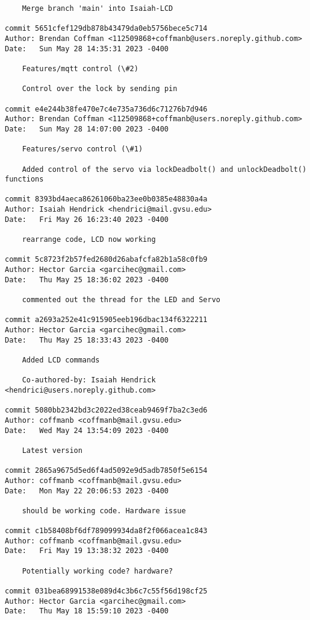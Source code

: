 \begin{verbatim}
    Merge branch 'main' into Isaiah-LCD

commit 5651cfef129db878b43479da0eb5756bece5c714
Author: Brendan Coffman <112509868+coffmanb@users.noreply.github.com>
Date:   Sun May 28 14:35:31 2023 -0400

    Features/mqtt control (\#2)
    
    Control over the lock by sending pin

commit e4e244b38fe470e7c4e735a736d6c71276b7d946
Author: Brendan Coffman <112509868+coffmanb@users.noreply.github.com>
Date:   Sun May 28 14:07:00 2023 -0400

    Features/servo control (\#1)
    
    Added control of the servo via lockDeadbolt() and unlockDeadbolt() functions

commit 8393bd4aeca86261060ba23ee0b0385e48830a4a
Author: Isaiah Hendrick <hendrici@mail.gvsu.edu>
Date:   Fri May 26 16:23:40 2023 -0400

    rearrange code, LCD now working

commit 5c8723f2b57fed2680d26abafcfa82b1a58c0fb9
Author: Hector Garcia <garcihec@gmail.com>
Date:   Thu May 25 18:36:02 2023 -0400

    commented out the thread for the LED and Servo

commit a2693a252e41c915905eeb196dbac134f6322211
Author: Hector Garcia <garcihec@gmail.com>
Date:   Thu May 25 18:33:43 2023 -0400

    Added LCD commands
    
    Co-authored-by: Isaiah Hendrick <hendrici@users.noreply.github.com>

commit 5080bb2342bd3c2022ed38ceab9469f7ba2c3ed6
Author: coffmanb <coffmanb@mail.gvsu.edu>
Date:   Wed May 24 13:54:09 2023 -0400

    Latest version

commit 2865a9675d5ed6f4ad5092e9d5adb7850f5e6154
Author: coffmanb <coffmanb@mail.gvsu.edu>
Date:   Mon May 22 20:06:53 2023 -0400

    should be working code. Hardware issue

commit c1b58408bf6df789099934da8f2f066acea1c843
Author: coffmanb <coffmanb@mail.gvsu.edu>
Date:   Fri May 19 13:38:32 2023 -0400

    Potentially working code? hardware?

commit 031bea68991538e089d4c3b6c7c55f56d198cf25
Author: Hector Garcia <garcihec@gmail.com>
Date:   Thu May 18 15:59:10 2023 -0400


\end{verbatim}

